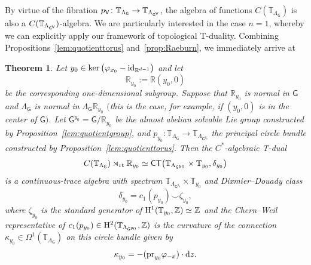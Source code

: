 \documentclass[pdftex]{sigma}
\numberwithin{equation}{section}
\newcommand{\C}{\complex}
\newcommand{\Z}{\zed}
\def\dd{{\rm d}}
\def\Id{{\rm id}}
\def\V{{\sf V}}
\def\T{{\sf T}}
\def\C{{\sf C}}
\newcommand{\sfG}{\mathsf{G}}
\newcommand{\rmH}{{\rm H}}
\newcommand{\rt}{{\rm rt}}
\newcommand{\R}{\real}
\newcommand{\complex}{{\mathbb C}} %
\newcommand{\zed}{{\mathbb Z}} %
\newcommand{\real}{{\mathbb R}} %
\newcommand{\torus}{{\mathbb T}} %
\newtheorem{Theorem}{Theorem}[section]
\begin{document}
By virtue of the fibration
$p_\V\colon \torus_{\Lambda_\sfG}\to\torus_{\Lambda_{\sfG^{\text{\tiny$\V$}}}}$, the
algebra of functions $C(\torus_{\Lambda_\sfG})$ is also a
$C(\torus_{\Lambda_{\sfG^{\text{\tiny$\V$}}}})$-algebra. We are particularly interested in the case $n=1$, whereby we can
explicitly apply our framework of topological T-duality. Combining
Propositions~\ref{lem:quotienttorus} and~\ref{prop:Raeburn}, we immediately arrive at
\begin{Theorem}\label{prop:RyTduality}
Let $y_0\in \ker\big(\varphi_{x_0}-\Id_{\R^{d-1}}\big)$ and let
\[
\R_{y_0}:=\R (y_0,0)
\]
be the corresponding one-dimensional subgroup. Suppose that $\R_{y_0}$ is normal
in $\sfG$ and $\Lambda_\sfG$ is normal in $\Lambda_\sfG \R_{y_0}$
$($this is the case, for example, if $(y_0,0)$ is in the center of $\sfG)$.
Let $\sfG^{y_0}=\sfG/\R_{y_0}$ be the almost abelian
solvable Lie group constructed by Proposition~{\rm \ref{lem:quotientgroup}}, and
$p_{y_0}\colon \torus_{\Lambda_{\sfG}}\to\torus_{\Lambda_{\sfG^{y_0}}}$ the
principal circle bundle
constructed by Proposition~{\rm \ref{lem:quotienttorus}}.
Then the $C^*$-algebraic T-dual
\[
C(\torus_{\Lambda_\sfG})\rtimes_\rt\R_{y_0} \simeq \C\T\big(\torus_{\Lambda_{\sfG^{y_0}}}\times\torus_{y_0},\delta_{y_0}\big)
\]
is a continuous-trace algebra with spectrum $\torus_{\Lambda_{\sfG^{y_0}}}\times\torus_{y_0}$
and Dixmier--Douady class
\[
\delta_{y_0}=c_1(p_{y_0})\smile \zeta_{y_0} ,
\]
where $\zeta_{y_0}$ is the standard
generator of $\rmH^1(\torus_{y_0},\Z)\simeq\Z$ and the Chern--Weil
representative of
$c_1(p_{y_0})\in\rmH^2(\torus_{\Lambda_{\sfG^{y_0}}},\Z)$
is the curvature of the connection
$\kappa_{y_0}\in\Omega^1(\torus_{\Lambda_{\sfG}})$ on this circle
bundle given by
\[
\kappa_{y_0} = - ({\rm pr}_{y_0} \varphi_{-x})\cdot\dd z .
\]
\end{Theorem}
\end{document}
